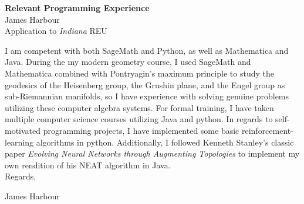 \documentclass[11pt]{article}
\begin{document}
\begin{center}
  \textbf{Relevant Programming Experience}\\
  James Harbour \\
  Application to \emph{Indiana} REU
\end{center}

I am competent with both SageMath and Python, as well as Mathematica and Java. During the my modern geometry course, I used SageMath and Mathematica combined with Pontryagin's maximum principle to study the geodesics of the Heisenberg group, the Grushin plane, and the Engel group as sub-Riemannian manifolds, so I have experience with solving genuine problems utilizing these computer algebra systems. For formal training, I have taken multiple computer science courses utilizing Java and python. In regards to self-motivated programming projects, I have implemented some basic reinforcement-learning algorithms in python. Additionally, I followed Kenneth Stanley's classic paper \emph{Evolving Neural Networks through Augmenting Topologies} to implement my own rendition of his NEAT algorithm in Java.\\

\noindent Regards,

\vspace{0.25cm}
\noindent James Harbour
\end{document}
